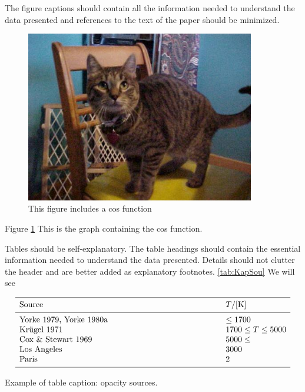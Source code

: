 \documentclass[letterpaper,12pt]{article}
\begin{document}
The figure captions should contain all the information needed to 
understand the data presented and references to the text of the paper 
should be minimized.


\begin{figure}[htb]
  \centering
  \includegraphics[width=10cm]{Images/cats_00001.jpg}
     \caption{This figure includes a cos function}
         \label{Fig:Fig1}
\end{figure}

Figure \ref {Fig:Fig1} This is the graph containing the cos function.

Tables should be self-explanatory. The table headings should contain 
the essential information needed to understand the data presented. 
Details should not clutter the header and are better added as explanatory 
footnotes. \ref{tab:KapSou} We will see

\begin{table}[htb]
      
     $$ 
         \begin{array}{p{0.7\linewidth}l}
            \hline
            \noalign{\smallskip}
            Source      &  T / {[\mathrm{K}]} \\
            \noalign{\smallskip}
            \hline
            \noalign{\smallskip}
            Yorke 1979, Yorke 1980a & \leq 1700           \\
            Kr\"ugel 1971           & 1700 \leq T \leq 5000 \\
            Cox \& Stewart 1969     & 5000 \leq             \\
            Los Angeles & 3000\\
            Paris & 2\\
            \noalign{\smallskip}
            \hline
         \end{array}
     $$ 
     \caption[]{Example of table caption: opacity sources.}
         \label{tab:KapSou}
\end{table}
\end{document}
